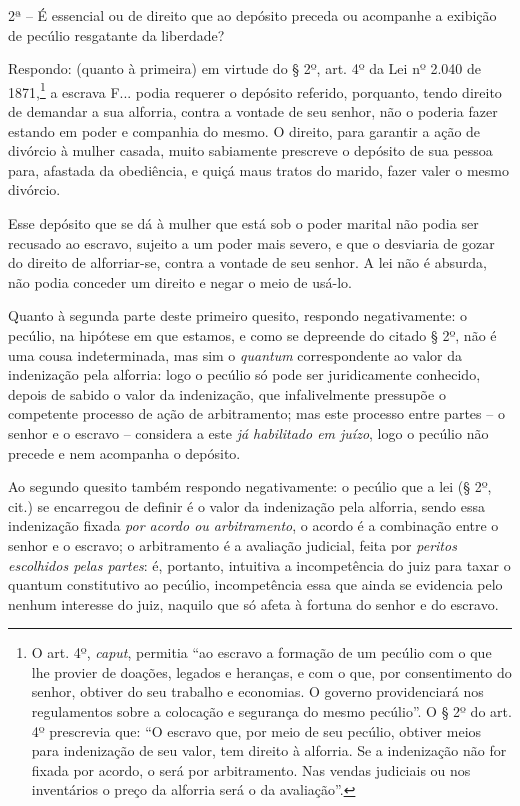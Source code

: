2ª -- É essencial ou de direito que ao depósito preceda ou acompanhe a
exibição de pecúlio resgatante da liberdade?

Respondo: (quanto à primeira) em virtude do § 2º, art. 4º da Lei nº
2.040 de 1871,\footnote{ O art. 4º, \emph{caput}, permitia ``ao escravo
  a formação de um pecúlio com o que lhe provier de doações, legados e
  heranças, e com o que, por consentimento do senhor, obtiver do seu
  trabalho e economias. O governo providenciará nos regulamentos sobre a
  colocação e segurança do mesmo pecúlio''. O § 2º do art. 4º prescrevia
  que: ``O escravo que, por meio de seu pecúlio, obtiver meios para
  indenização de seu valor, tem direito à alforria. Se a indenização não
  for fixada por acordo, o será por arbitramento. Nas vendas judiciais
  ou nos inventários o preço da alforria será o da avaliação''.} a
escrava F... podia requerer o depósito referido, porquanto, tendo
direito de demandar a sua alforria, contra a vontade de seu senhor, não
o poderia fazer estando em poder e companhia do mesmo. O direito, para
garantir a ação de divórcio à mulher casada, muito sabiamente prescreve
o depósito de sua pessoa para, afastada da obediência, e quiçá maus
tratos do marido, fazer valer o mesmo divórcio.

Esse depósito que se dá à mulher que está sob o poder marital não podia
ser recusado ao escravo, sujeito a um poder mais severo, e que o
desviaria de gozar do direito de alforriar-se, contra a vontade de seu
senhor. A lei não é absurda, não podia conceder um direito e negar o
meio de usá-lo.

Quanto à segunda parte deste primeiro quesito, respondo negativamente: o
pecúlio, na hipótese em que estamos, e como se depreende do citado § 2º,
não é uma cousa indeterminada, mas sim o \emph{quantum} correspondente
ao valor da indenização pela alforria: logo o pecúlio só pode ser
juridicamente conhecido, depois de sabido o valor da indenização, que
infalivelmente pressupõe o competente processo de ação de arbitramento;
mas este processo entre partes -- o senhor e o escravo -- considera a
este \emph{já habilitado em juízo}, logo o pecúlio não precede e nem
acompanha o depósito.

Ao segundo quesito também respondo negativamente: o pecúlio que a lei (§
2º, cit.) se encarregou de definir é o valor da indenização pela
alforria, sendo essa indenização fixada \emph{por acordo ou
arbitramento}, o acordo é a combinação entre o senhor e o escravo; o
arbitramento é a avaliação judicial, feita por \emph{peritos escolhidos
pelas partes}: é, portanto, intuitiva a incompetência do juiz para taxar
o quantum constitutivo ao pecúlio, incompetência essa que ainda se
evidencia pelo nenhum interesse do juiz, naquilo que só afeta à fortuna
do senhor e do escravo.

